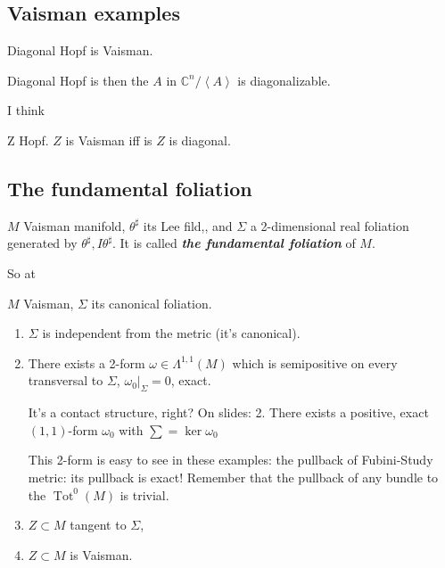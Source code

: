 \subsection{Vaisman examples}
\begin{thm}\leavevmode
Diagonal Hopf is Vaisman.
\end{thm}

Diagonal Hopf is then the \(A\) in \(\mathbb{C}^n/\left<A\right>\) is diagonalizable.

I think

\begin{thm}\leavevmode
Z Hopf. \(Z\) is Vaisman iff is \(Z\) is diagonal.
\end{thm}

\subsection{The fundamental foliation}

\begin{defn}\leavevmode
\(M\) Vaisman manifold, \(\theta ^\sharp\) its Lee fild,, and \(\Sigma\) a 2-dimensional real foliation generated by \(\theta ^\sharp, I\theta ^\sharp\). It is called \textit{\textbf{the fundamental foliation}} of \(M\).
\end{defn}

\begin{question}\leavevmode
So at 
\end{question}

\begin{thm}\leavevmode
\(M\) Vaisman, \(\Sigma\) its canonical foliation.

\begin{enumerate}
\item \(\Sigma\) is independent from the metric (it's canonical).
\item There exists a 2-form \(\omega \in \Lambda^{1,1}(M)\) which is semipositive on every transversal to \(\Sigma\), \(\omega_0|_{\Sigma}=0\), exact.

{\color{6}It's a contact structure, right? On slides: 2. There exists a positive, exact \((1,1)\)-form \(\omega_0\) with \(\sum= \ker \omega_0\)}
	\begin{remark}\leavevmode
	This 2-form is easy to see in these examples: the pullback of Fubini-Study metric: its pullback is exact! Remember that the pullback of any bundle to the \(\operatorname{Tot}^0(M)\) is trivial.
	\end{remark}
\item  \(Z \subset M\) tangent to \(\Sigma\),
\item \(Z \subset M\) is Vaisman.
\end{enumerate}
\end{thm}






